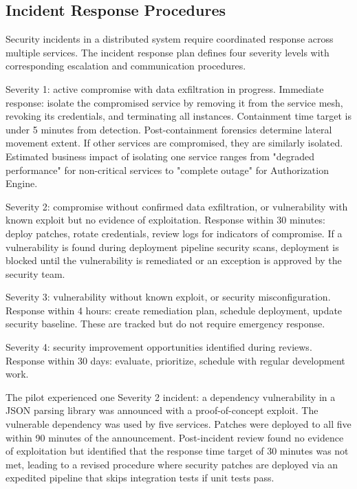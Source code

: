 \subsection{Incident Response Procedures}

Security incidents in a distributed system require coordinated response across multiple services. The incident response plan defines four severity levels with corresponding escalation and communication procedures.

Severity 1: active compromise with data exfiltration in progress. Immediate response: isolate the compromised service by removing it from the service mesh, revoking its credentials, and terminating all instances. Containment time target is under 5 minutes from detection. Post-containment forensics determine lateral movement extent. If other services are compromised, they are similarly isolated. Estimated business impact of isolating one service ranges from "degraded performance" for non-critical services to "complete outage" for Authorization Engine.

Severity 2: compromise without confirmed data exfiltration, or vulnerability with known exploit but no evidence of exploitation. Response within 30 minutes: deploy patches, rotate credentials, review logs for indicators of compromise. If a vulnerability is found during deployment pipeline security scans, deployment is blocked until the vulnerability is remediated or an exception is approved by the security team.

Severity 3: vulnerability without known exploit, or security misconfiguration. Response within 4 hours: create remediation plan, schedule deployment, update security baseline. These are tracked but do not require emergency response.

Severity 4: security improvement opportunities identified during reviews. Response within 30 days: evaluate, prioritize, schedule with regular development work.

The pilot experienced one Severity 2 incident: a dependency vulnerability in a JSON parsing library was announced with a proof-of-concept exploit. The vulnerable dependency was used by five services. Patches were deployed to all five within 90 minutes of the announcement. Post-incident review found no evidence of exploitation but identified that the response time target of 30 minutes was not met, leading to a revised procedure where security patches are deployed via an expedited pipeline that skips integration tests if unit tests pass.
